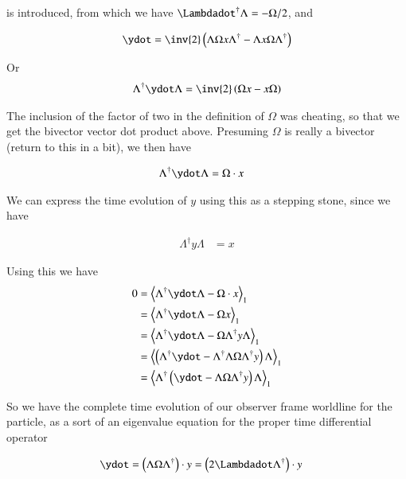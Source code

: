 \documentclass{article}
\begin{document}
is introduced, from which we have $\Lambdadot^\dagger \Lambda = -\Omega/2$, and

\begin{align*}
\ydot &= \inv{2} \left( \Lambda \Omega x \Lambda^\dagger - \Lambda x \Omega \Lambda^\dagger \right) \\
\end{align*}

Or
\begin{align*}
\Lambda^\dagger \ydot \Lambda &= \inv{2} \left( \Omega x - x \Omega \right) \\
\end{align*}

The inclusion of the factor of two in the definition of $\Omega$ was cheating, so that we get the bivector vector dot product above.  Presuming $\Omega$ is really a bivector (return to this in a bit), we then have

\begin{align}
\Lambda^\dagger \ydot \Lambda &= \Omega \cdot x 
\end{align}

We can express the time evolution of $y$ using this as a stepping stone, since we have

\begin{align*}
\Lambda^\dagger y \Lambda &= x 
\end{align*}

Using this we have
\begin{align*}
0 
&= \gpgradeone{ \Lambda^\dagger \ydot \Lambda - \Omega \cdot x } \\
&= \gpgradeone{ \Lambda^\dagger \ydot \Lambda - \Omega x } \\
&= \gpgradeone{ \Lambda^\dagger \ydot \Lambda - \Omega \Lambda^\dagger y \Lambda } \\
&= \gpgradeone{ \left( \Lambda^\dagger \ydot - \Lambda^\dagger \Lambda \Omega \Lambda^\dagger y \right) \Lambda } \\
&= \gpgradeone{ \Lambda^\dagger \left( \ydot - \Lambda \Omega \Lambda^\dagger y \right) \Lambda } \\
\end{align*}

So we have the complete time evolution of our observer frame worldline for the particle, as a sort of an eigenvalue 
equation for the proper time differential operator

\begin{align*}
\ydot 
&= \left( \Lambda \Omega \Lambda^\dagger \right) \cdot y = \left( 2 \Lambdadot \Lambda^\dagger \right) \cdot y 
\end{align*}
\end{document}

